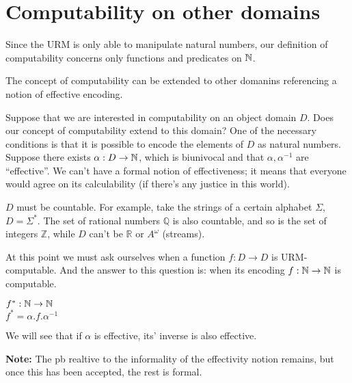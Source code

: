 \chapter{Computability on other domains}
Since the URM is only able to manipulate natural numbers, our definition of computability concerns only functions and predicates on $\mathbb{N}$.

The concept of computability can be extended to other domanins referencing a notion of effective encoding.

Suppose that we are interested in computability on an object domain $D$. 
Does our concept of computability extend to this domain? 
One of the necessary conditions is that it is possible to encode the elements of $D$ as natural numbers. 
Suppose there exists $ \alpha: D \rightarrow \mathbb{N} $, which is biunivocal and that $ \alpha, \alpha^{-1} $ are ``effective''. 
We can't have a formal notion of effectiveness; it means that everyone would agree on its calculability (if there's any justice in this world).

$D$ must be countable. For example, take the strings of a certain alphabet $ \Sigma $, $ D = \Sigma^* $. 
The set of rational numbers $ \mathbb{Q} $ is also countable, and so is the set of integers $\mathbb{Z}$, while $D$ can't be  $ \mathbb{R} $ or $A^\omega$ (streams).

At this point we must ask ourselves when a function $ f: D \rightarrow D $ is URM-computable. 
And the answer to this question is: when its encoding $ f: \mathbb{N} \rightarrow \mathbb{N} $ is computable.

$ f^*: \mathbb{N} \rightarrow \mathbb{N} $\\
$ f^* = \alpha . f . \alpha^{-1} $

We will see that if $\alpha$ is effective, its' inverse is also effective.

\textbf{Note:} The pb realtive to the informality of the effectivity notion remains, but once this has been accepted, the rest is formal.

